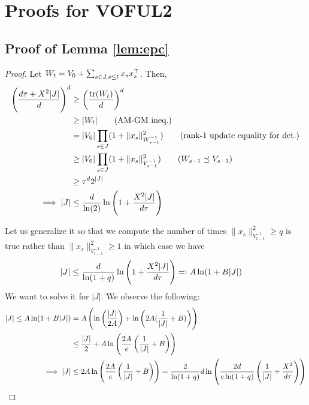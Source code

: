 


\section{Proofs for VOFUL2}

\subsection{Proof of Lemma \ref{lem:epc}}

\begin{proof}
  Let $W_t = V_0 + \sum_{s\in J,s\le t} x_s x_s^{\top}$.
  Then,
  \begin{align*}
    \del{\fr{d\tau + X^2|J|}{d} }^d
    &\ge \del{\fr{\tr(W_t)}{d} }^d 
    \\&\ge |W_t|   \tag{AM-GM ineq.}
    \\&= |V_0| \prod_{s\in J} (1 + \|x_s\|^2_{W_{s-1}^{-1} } ) \tag{rank-1 update equality for det.}
    \\&\ge |V_0| \prod_{s\in J} (1 + \|x_s\|^2_{V_{s-1}^{-1} } ) \tag{$W_{s-1} \preceq V_{s-1}$}
    \\&\ge \tau^d 2^{|J|}
    \\  \implies 
    |J| &\le \fr{d}{\ln(2)}\ln\del{1+\fr{X^2|J|}{d\tau} } 
  \end{align*}
  
  Let us generalize it so that we compute the number of times $\|x_s\|_{V_{t-1}^{-1}}^2 \ge q$ is true rather than $\|x_s\|_{V_{t-1}^{-1}}^2 \ge 1$ in which case we have
  \begin{align} \label{eq:20210425-01} 
    |J| &\le \fr{d}{\ln(1+q)}\ln\del{1+\fr{X^2|J|}{d\tau} } =: {A} \ln (1 + {B} |J|)
  \end{align}
  We want to solve it for $|J|$.
  We observe the following:
  \begin{align}
    |J| 
    \le A \ln(1 + B |J|) 
    &= A\del{\ln\del{\fr{|J|}{2A} } + \ln\del{2A(\fr{1}{|J|} + B) } } 
    \\&\le \fr{|J|}{2} + A \ln\del{\fr{2A}{e} \del{\fr{1}{|J|} + B } } 
    \\  \implies |J| &\le 2A \ln\del{\fr{2A}{e} \del{\fr{1}{|J|} + B } }  =  \fr{2}{\ln(1+q)} d \ln\del{\fr{2d}{e\ln(1+q)}\del{\fr 1 {|J|}  + \frac{ X^2}{ d\tau}}  }  \label{eq:20210425-03}
  \end{align}
  

\end{proof}
